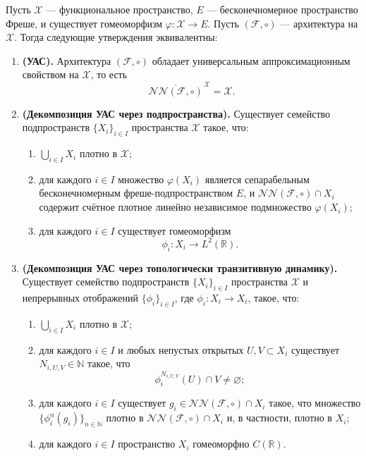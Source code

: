 \documentclass[../NDCNNAI_main.tex]{subfiles}
\begin{document}
\begin{lemma}
\label{lem:kratsios_lemma2_exact}
Пусть $\mathcal{X}$ --- функциональное пространство, $E$ --- бесконечномерное
пространство Фреше, и существует гомеоморфизм $\varphi:\mathcal{X}\to E$.
Пусть $(\mathcal{F},\circ)$ --- архитектура на $\mathcal{X}$.
Тогда следующие утверждения эквивалентны:

\begin{enumerate}[label=(\roman*)]
\item \textbf{(УАС).}
Архитектура $(\mathcal{F},\circ)$ обладает универсальным аппроксимационным свойством на $\mathcal{X}$, то есть
\[
\overline{\mathcal{NN}(\mathcal{F},\circ)}^{\,\mathcal{X}}=\mathcal{X}.
\]

\item \textbf{(Декомпозиция УАС через подпространства).}
Существует семейство подпространств $\{X_i\}_{i\in I}$ пространства $\mathcal{X}$ такое, что:
\begin{enumerate}[label=(\alph*)]
  \item $\displaystyle \bigcup_{i\in I}X_i$ плотно в $\mathcal{X}$;
  \item для каждого $i\in I$ множество $\varphi(X_i)$ является
  сепарабельным бесконечномерным фреше-подпространством $E$, и
  $\mathcal{NN}(\mathcal{F},\circ)\cap X_i$ содержит
  счётное плотное линейно независимое подмножество $\varphi(X_i)$;
  \item для каждого $i\in I$ существует гомеоморфизм
  \[
  \phi_i\colon X_i \to L^2(\mathbb{R}).
  \]
\end{enumerate}

\item\textbf{(Декомпозиция УАС через топологически транзитивную динамику).}
Существует семейство подпространств $\{X_i\}_{i\in I}$ пространства $\mathcal{X}$
и непрерывных отображений $\{\phi_i\}_{i\in I}$, где $\phi_i\colon X_i\to X_i$, такое, что:
\begin{enumerate}[label=(\alph*)]
  \item $\displaystyle \bigcup_{i\in I}X_i$ плотно в $\mathcal{X}$;
  \item для каждого $i\in I$ и любых непустых открытых $U,V\subset X_i$
  существует $N_{i,U,V}\in\mathbb{N}$ такое, что
  \[
  \phi_i^{N_{i,U,V}}(U)\cap V\neq\varnothing;
  \]
  \item для каждого $i\in I$ существует $g_i\in \mathcal{NN}(\mathcal{F},\circ)\cap X_i$
  такое, что множество $\{\phi_i^n(g_i)\}_{n\in\mathbb{N}}$ плотно в
  $\mathcal{NN}(\mathcal{F},\circ)\cap X_i$ и, в частности, плотно в $X_i$;
  \item для каждого $i\in I$ пространство $X_i$ гомеоморфно $C(\mathbb{R})$.
\end{enumerate}


\end{enumerate}
\end{lemma}
\end{document}
